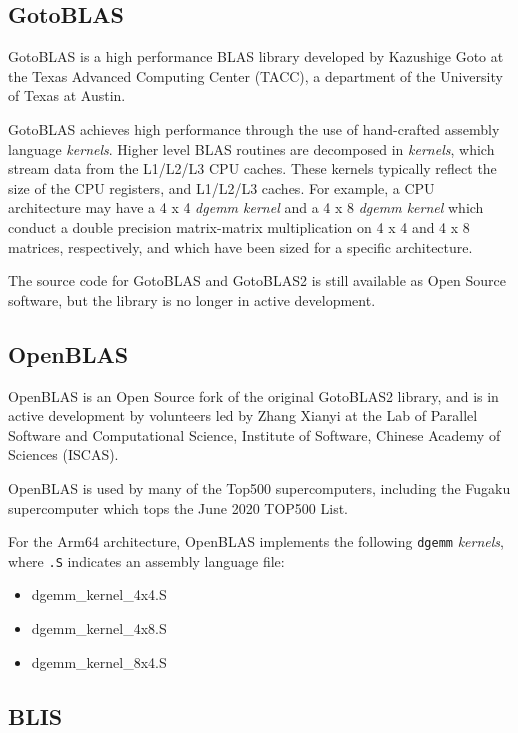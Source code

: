 %
%
\subsection{GotoBLAS}

GotoBLAS is a high performance BLAS library developed by Kazushige Goto at the Texas Advanced Computing Center (TACC), a department of the University of Texas at Austin.

GotoBLAS achieves high performance through the use of hand-crafted assembly language \emph{kernels}. Higher level BLAS routines are decomposed in \emph{kernels}, which stream data from the L1/L2/L3 CPU caches. These kernels typically reflect the size of the CPU registers, and L1/L2/L3 caches. For example, a CPU architecture may have a 4 x 4 \emph{dgemm kernel} and a 4 x 8 \emph{dgemm kernel} which conduct a double precision matrix-matrix multiplication on 4 x 4 and 4 x 8 matrices, respectively, and which have been sized for a specific architecture.

The source code for GotoBLAS and GotoBLAS2 is still available as Open Source software, but the library is no longer in active development.


%
%
\subsection{OpenBLAS}

OpenBLAS is an Open Source fork of the original GotoBLAS2 library, and is in active development by volunteers led by Zhang Xianyi at the Lab of Parallel Software and Computational Science, Institute of Software, Chinese Academy of Sciences (ISCAS).

OpenBLAS is used by many of the Top500 supercomputers, including the Fugaku supercomputer which tops the June 2020 TOP500 List.

For the Arm64 architecture, OpenBLAS implements the following \verb|dgemm| \emph{kernels}, where \verb|.S| indicates an assembly language file:

\begin{itemize}
  \item dgemm\_kernel\_4x4.S
  \item dgemm\_kernel\_4x8.S
  \item dgemm\_kernel\_8x4.S 
\end{itemize}


%
%
\subsection{BLIS}

